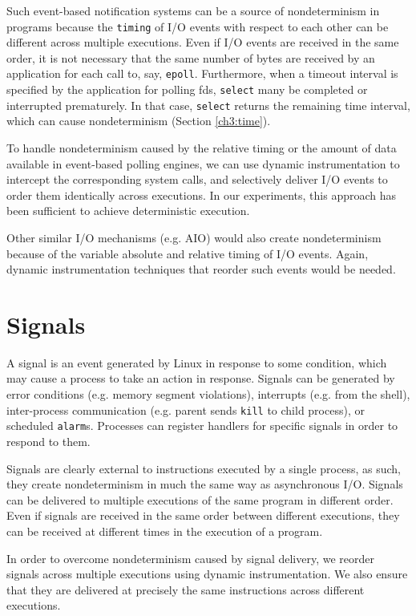 Such event-based notification systems can be a source
of nondeterminism in programs because the
\texttt{timing} of I/O events with respect to each other
can be different across multiple executions.
Even if I/O events are received in the same order,
it is not necessary that the same number of bytes are
received by an application for each call
to, say, \texttt{epoll}. Furthermore, when a timeout
interval is specified by the application for polling fds,
\texttt{select} many be completed or interrupted
prematurely. In that case, \texttt{select} returns
the remaining time interval, which can
cause nondeterminism (Section \ref{ch3:time}).

To handle nondeterminism caused by the relative
timing or the amount of data available 
in event-based polling engines, we 
can use dynamic instrumentation to intercept
the corresponding system calls, and
selectively deliver I/O events to order them
identically across executions. 
In our experiments, this approach has been sufficient to 
achieve deterministic execution.

Other similar I/O mechanisms (e.g. AIO) 
would also create nondeterminism because of the
variable absolute and relative timing of I/O events.
Again, dynamic instrumentation techniques that 
reorder such events would be needed.

\section{Signals}
A signal is an event generated by Linux
in response to some condition, which may cause
a process to take an action in response.
Signals can be generated by error conditions
(e.g. memory segment violations), 
interrupts (e.g. from the shell), 
inter-process communication (e.g. parent 
sends \texttt{kill} to child process),
or scheduled \texttt{alarm}s. 
Processes can register
handlers for specific signals in order
to respond to them.

Signals are clearly external to
instructions executed by a single process,
as such, they create nondeterminism in
much the same way as asynchronous I/O.
Signals can be delivered to multiple executions
of the same program in different order.
Even if signals are received in the
same order between different executions,
they can be received at different times
in the execution of a program.

In order to overcome nondeterminism caused
by signal delivery, we reorder signals 
across multiple executions using
dynamic instrumentation.
We also ensure that they are delivered 
at precisely the same instructions
across different executions.

